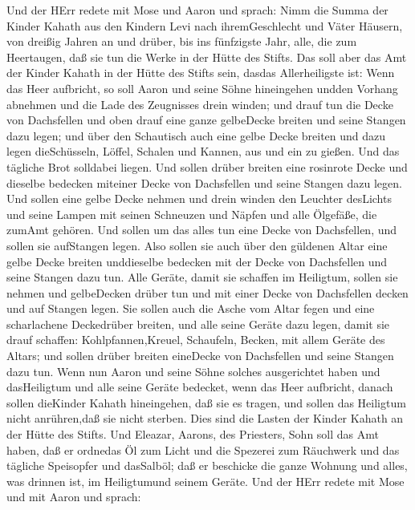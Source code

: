  Und der HErr redete mit Mose und Aaron und sprach:
 Nimm die Summa der Kinder Kahath aus den Kindern Levi nach
ihremGeschlecht und Väter Häusern,  von dreißig Jahren an
und drüber, bis ins fünfzigste Jahr, alle, die zum Heertaugen, daß sie
tun die Werke in der Hütte des Stifts.  Das soll aber das
Amt der Kinder Kahath in der Hütte des Stifts sein, dasdas
Allerheiligste ist:  Wenn das Heer aufbricht, so soll Aaron
und seine Söhne hineingehen undden Vorhang abnehmen und die Lade des
Zeugnisses drein winden;  und drauf tun die Decke von
Dachsfellen und oben drauf eine ganze gelbeDecke breiten und seine
Stangen dazu legen;  und über den Schautisch auch eine gelbe
Decke breiten und dazu legen dieSchüsseln, Löffel, Schalen und Kannen,
aus und ein zu gießen. Und das tägliche Brot solldabei liegen.
 Und sollen drüber breiten eine rosinrote Decke und dieselbe
bedecken miteiner Decke von Dachsfellen und seine Stangen dazu legen.
 Und sollen eine gelbe Decke nehmen und drein winden den
Leuchter desLichts und seine Lampen mit seinen Schneuzen und Näpfen und
alle Ölgefäße, die zumAmt gehören.  Und sollen um das alles
tun eine Decke von Dachsfellen, und sollen sie aufStangen legen.
 Also sollen sie auch über den güldenen Altar eine gelbe
Decke breiten unddieselbe bedecken mit der Decke von Dachsfellen und
seine Stangen dazu tun.  Alle Geräte, damit sie schaffen im
Heiligtum, sollen sie nehmen und gelbeDecken drüber tun und mit einer
Decke von Dachsfellen decken und auf Stangen legen.  Sie
sollen auch die Asche vom Altar fegen und eine scharlachene Deckedrüber
breiten,  und alle seine Geräte dazu legen, damit sie drauf
schaffen: Kohlpfannen,Kreuel, Schaufeln, Becken, mit allem Geräte des
Altars; und sollen drüber breiten eineDecke von Dachsfellen und seine
Stangen dazu tun.  Wenn nun Aaron und seine Söhne solches
ausgerichtet haben und dasHeiligtum und alle seine Geräte bedecket, wenn
das Heer aufbricht, danach sollen dieKinder Kahath hineingehen, daß sie
es tragen, und sollen das Heiligtum nicht anrühren,daß sie nicht
sterben. Dies sind die Lasten der Kinder Kahath an der Hütte des Stifts.
 Und Eleazar, Aarons, des Priesters, Sohn soll das Amt
haben, daß er ordnedas Öl zum Licht und die Spezerei zum Räuchwerk und
das tägliche Speisopfer und dasSalböl; daß er beschicke die ganze
Wohnung und alles, was drinnen ist, im Heiligtumund seinem Geräte.
 Und der HErr redete mit Mose und mit Aaron und sprach:
